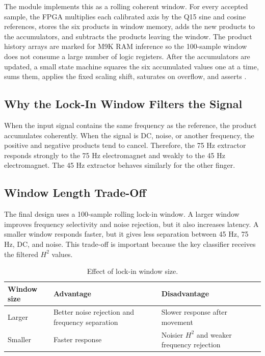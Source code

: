 The module  implements this as a rolling coherent window. For every accepted sample, the FPGA multiplies each calibrated axis by the Q15 sine and cosine references, stores the six products in window memory, adds the new products to the accumulators, and subtracts the products leaving the window. The product history arrays are marked for M9K RAM inference so the 100-sample window does not consume a large number of logic registers. After the accumulators are updated, a small state machine squares the six accumulated values one at a time, sums them, applies the fixed scaling shift, saturates on overflow, and asserts .

\subsection{Why the Lock-In Window Filters the Signal}

When the input signal contains the same frequency as the reference, the product accumulates coherently. When the signal is DC, noise, or another frequency, the positive and negative products tend to cancel. Therefore, the 75 Hz extractor responds strongly to the 75 Hz electromagnet and weakly to the 45 Hz electromagnet. The 45 Hz extractor behaves similarly for the other finger.

\subsection{Window Length Trade-Off}

The final design uses a 100-sample rolling lock-in window. A larger window improves frequency selectivity and noise rejection, but it also increases latency. A smaller window responds faster, but it gives less separation between 45 Hz, 75 Hz, DC, and noise. This trade-off is important because the key classifier receives the filtered $H^2$ values.

\begin{table}[H]
    \centering
    \caption{Effect of lock-in window size.}
    \label{tab:window_tradeoff}
    \renewcommand{\arraystretch}{1.2}
    \begin{tabularx}{0.9\textwidth}{p{3.5cm} X X}
        \toprule
        \textbf{Window size} & \textbf{Advantage} & \textbf{Disadvantage} \\
        \midrule
        Larger & Better noise rejection and frequency separation & Slower response after movement \\
        Smaller & Faster response & Noisier $H^2$ and weaker frequency rejection \\
        \bottomrule
    \end{tabularx}
\end{table}

